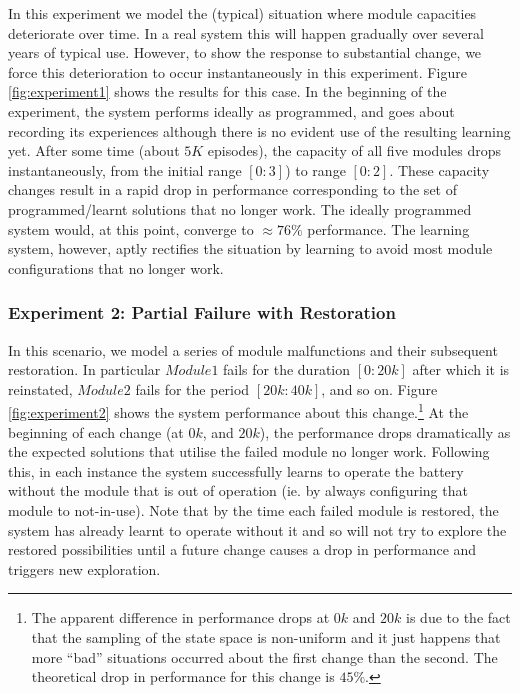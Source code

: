 In this experiment we model the (typical) situation where module capacities deteriorate over time. In a real system this will happen gradually over several years of typical use. However, to show the response to substantial change, we force this deterioration to occur instantaneously in this experiment. 
Figure \ref{fig:experiment1} shows the results for this case. In the beginning of the experiment, the system performs ideally as programmed, and goes about recording its experiences although there is no evident use of the resulting learning yet. After some time (about $5K$ episodes), the capacity of all five modules drops instantaneously, from the initial range $[0:3]$) to range $[0:2]$. 
These capacity changes result in a rapid drop in performance corresponding to the set of programmed/learnt solutions that no longer work. The ideally programmed system would, at this point, converge to $\approx 76\%$ performance. The learning system, however, aptly rectifies the situation by learning to avoid most module configurations that no longer work. 


%

\subsubsection{Experiment 2: Partial Failure with Restoration}

In this scenario, we model a series of module malfunctions and their subsequent restoration. In particular $Module1$ fails for the duration $[0:20k]$ after which it is reinstated, $Module2$ fails for the period $[20k:40k]$, and so on. Figure \ref{fig:experiment2} shows the system performance about this change.\footnote{The apparent difference in performance drops at $0k$ and $20k$ is due to the fact that the sampling of the state space is non-uniform and it just happens that more ``bad'' situations occurred about the first change than the second. The theoretical drop in performance for this change is $45\%$.} At the beginning of each change (at $0k$, and $20k$), the performance drops dramatically as the expected solutions that utilise the failed module no longer work. Following this, in each instance the system successfully learns to operate the battery without the module that is out of operation (ie. by always configuring that module to not-in-use). Note that by the time each failed module is restored, the system has already learnt to operate without it and so will not try to explore the restored possibilities until a future change causes a drop in performance and triggers new exploration.


